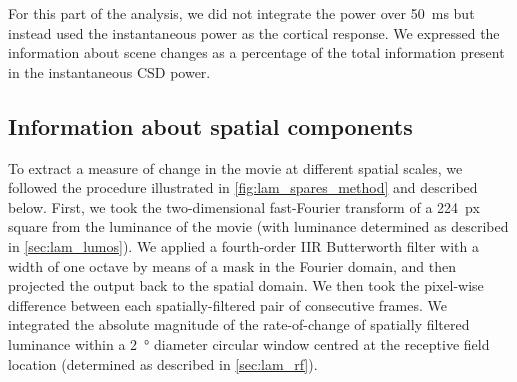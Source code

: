For this part of the analysis, we did not integrate the power over \SI{50}{\milli\second} but instead used the instantaneous power as the cortical response.
We expressed the information about scene changes as a percentage of the total information present in the instantaneous \ac{CSD} power.


\subsection{Information about spatial components}
\label{sec:lam_spares_method}

To extract a measure of change in the movie at different spatial scales, we followed the procedure illustrated in \autoref{fig:lam_spares_method} and described below.
First, we took the two-dimensional fast-Fourier transform of a \SI{224}{px} square from the luminance of the movie (with luminance determined as described in \autoref{sec:lam_lumos}).
We applied a fourth-order \ac{IIR} Butterworth filter with a width of one octave by means of a mask in the Fourier domain, and then projected the output back to the spatial domain.
We then took the pixel-wise difference between each spatially-filtered pair of consecutive frames.
We integrated the absolute magnitude of the rate-of-change of spatially filtered luminance within a \SI{2}{\degree} diameter circular window centred at the receptive field location (determined as described in \autoref{sec:lam_rf}).

